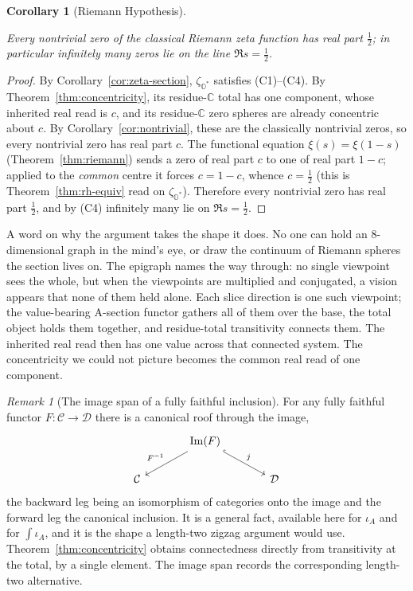 \documentclass[11pt]{article}
\newcommand{\OO}{\mathbb{O}}
\newcommand{\CC}{\mathbb{C}}
\newcommand{\Ostar}{\OO^{*}}
\newcommand{\zetaO}{\zeta_{\Ostar}}
\providecommand{\lean}[1]{}
\providecommand{\leanok}{}
\providecommand{\uses}[1]{}
\theoremstyle{plain}
\newtheorem{corollary}[theorem]{Corollary}
\theoremstyle{definition}
\theoremstyle{remark}
\newtheorem{remark}[theorem]{Remark}
\begin{document}
\begin{corollary}[Riemann Hypothesis]\label{cor:rh}
\lean{zeta_riemannHypothesis, zeta_criticalLine_zeros_infinite}
\leanok
\uses{cor:zeta-section, thm:concentricity, cor:nontrivial, thm:rh-equiv}
Every nontrivial zero of the classical Riemann zeta function has real part $\tfrac12$; in
particular infinitely many zeros lie on the line $\Re s=\tfrac12$.
\end{corollary}
\begin{proof}
By Corollary~\ref{cor:zeta-section}, $\zetaO$ satisfies \textup{(C1)--(C4)}. By
Theorem~\ref{thm:concentricity}, its residue-$\CC$ total has one component, whose inherited real read is $c$,
and its residue-$\CC$ zero spheres are already concentric about $c$. By
Corollary~\ref{cor:nontrivial}, these are
the classically nontrivial zeros, so every nontrivial zero has real part $c$. The functional
equation $\xi(s)=\xi(1-s)$ (Theorem~\ref{thm:riemann}) sends a zero of real part $c$ to one of
real part $1-c$; applied to the \emph{common} centre it forces $c=1-c$, whence $c=\tfrac12$ (this
is Theorem~\ref{thm:rh-equiv} read on $\zetaO$). Therefore every nontrivial zero has real part
$\tfrac12$, and by \textup{(C4)} infinitely many lie on $\Re s=\tfrac12$.
\end{proof}

A word on why the argument takes the shape it does. No one can hold an $8$-dimensional graph in the
mind's eye, or draw the continuum of Riemann spheres the section lives on. The epigraph names the
way through: no single viewpoint sees the whole, but when the viewpoints are multiplied and
conjugated, a vision appears that none of them held alone. Each slice direction is one such
viewpoint; the value-bearing A-section functor gathers all of them over the base, the total object holds them
together, and residue-total transitivity connects them. The inherited real read then
has one value across that connected system. The concentricity we could not picture
becomes the common real read of one component.

\begin{remark}[The image span of a fully faithful inclusion]\label{rmk:image-span}
For any fully faithful functor $F:\mathcal C\to\mathcal D$ there is a canonical roof through
the image,
\[
\begin{tikzcd}[column sep=large]
& \operatorname{Im}(F) \arrow[dl, "F^{-1}"'] \arrow[dr, hook, "j"] & \\
\mathcal C & & \mathcal D
\end{tikzcd}
\]
the backward leg being an isomorphism of categories onto the image and the forward leg the
canonical inclusion. It is a general fact, available here for $\iota_A$ and for
$\int\iota_A$, and it is the shape a length-two zigzag argument would use.
Theorem~\ref{thm:concentricity} obtains connectedness directly from transitivity at the total,
by a single element. The image span records the corresponding length-two alternative.
\end{remark}
\end{document}
